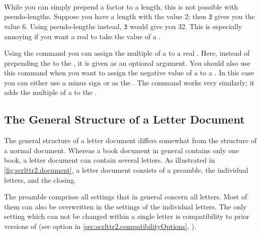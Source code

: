 \begin{Declaration}
    \\
\end{Declaration}
%
%
\begin{Explain}%
  While you can simply prepend a factor to a length, this is not
  possible with pseudo-lengths. Suppose you have a length 
  with the value 2; then \texttt{3} gives you the
  value 6. Using pseudo-lengths instead,
  \texttt{3} would give you
  32. This is especially annoying if you want a real
   to take the value of a .
\end{Explain}
Using the command  you can assign the
multiple of a  to a real .  Here,
instead of prepending the  to the ,
it is given as an optional argument. You should also use this command
when you want to assign the negative value of a 
to a . In this case you can either use a minus sign or
 as the . The command
 works very similarly; it adds the multiple
of a  to the .
%
%
%
%

\subsection{The General Structure of a Letter Document}
\label{sec:scrlttr2.document}

The general structure of a letter document differs somewhat from the
structure of a normal document. Whereas a book document in general
contains only one book, a letter document can contain several
letters. As illustrated in \autoref{fig:scrlttr2.document}, a letter
document consists of a preamble, the individual letters, and the
closing.

The preamble comprises all settings that in general concern all letters. Most
of them can also be overwritten in the settings of the individual letters. The
only setting which can not be changed within a single letter is compatibility
to prior versions of  (see option  in
\autoref{sec:scrlttr2.compatibilityOptions},
).

